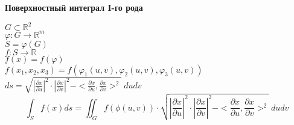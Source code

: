     \begin{center}
        \textbf{Поверхностный интеграл I-го рода}
    \end{center}
    $G \subset \mathbb{R}^2$\\
    $\varphi: G \rightarrow \mathbb{R}^m$\\
    $S = \varphi(G)$\\
    $f: S \rightarrow \mathbb{R}$\\
    $f(x) = f(\varphi)$\\
    $f(x_1, x_2, x_3) = f(\varphi_1(u, v), \varphi_2(u, v), \varphi_3(u, v))$\\
    $ds = \sqrt{|\frac{\partial x}{\partial u}|^2 \cdot |\frac{\partial x}{\partial v}|^2 - <\frac{\partial x}{\partial u}, \frac{\partial x}{\partial v}>^2}\ dudv$
    $$\int_S f(x) ds = \iint_G f(\phi(u, v)) \cdot \sqrt{|\frac{\partial x}{\partial u}|^2 \cdot |\frac{\partial x}{\partial v}|^2 - <\frac{\partial x}{\partial u}, \frac{\partial x}{\partial v}>^2}\ dudv$$
